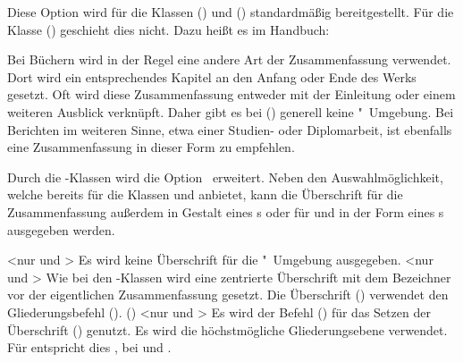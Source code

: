 \begin{DeclareEntity*}{}
\begin{DeclareEntity*}{}
\begin{DeclareEntity*}{}
\begin{Declaration}
Diese Option wird für die Klassen () 
und () standardmäßig bereitgestellt. Für 
die Klasse () geschieht dies nicht. Dazu 
heißt es im Handbuch:
%
\begin{quoting}
Bei Büchern wird in der Regel eine andere Art der Zusammenfassung verwendet. 
Dort wird ein entsprechendes Kapitel an den Anfang oder Ende des Werks gesetzt. 
Oft wird diese Zusammenfassung entweder mit der Einleitung oder einem weiteren 
Ausblick verknüpft. Daher gibt es bei () 
generell keine "~Umgebung. Bei Berichten im weiteren 
Sinne, etwa einer Studien- oder Diplomarbeit, ist ebenfalls eine 
Zusammenfassung in dieser Form zu empfehlen.
\end{quoting}
%
Durch die \TUDScript-Klassen wird die Option~ erweitert. 
Neben den Auswahlmöglichkeit, welche bereits \KOMAScript{} für die Klassen 
 und  anbietet, kann die Überschrift für 
die Zusammenfassung außerdem in Gestalt eines \sectionautorefname{}s oder für 
 und  in der Form eines 
\chapterautorefname{}s ausgegeben werden.
\begin{DeclareValues}
<nur  und >
  Es wird keine Überschrift für die "~Umgebung ausgegeben.
<nur  und >
  Wie bei den \KOMAScript-Klassen wird eine zentrierte Überschrift mit dem 
  Bezeichner  vor der eigentlichen Zusammenfassung gesetzt.
  Die Überschrift () verwendet den Gliederungsbefehl 
  ().
()
    <nur  und >
  Es wird der Befehl () für das Setzen der 
  Überschrift () genutzt. 
  Es wird die höchstmögliche Gliederungsebene verwendet. Für 
   entspricht dies , bei 
   und  .
\end{DeclareValues}


\end{Declaration}
\end{DeclareEntity*}
\end{DeclareEntity*}
\end{DeclareEntity*}
